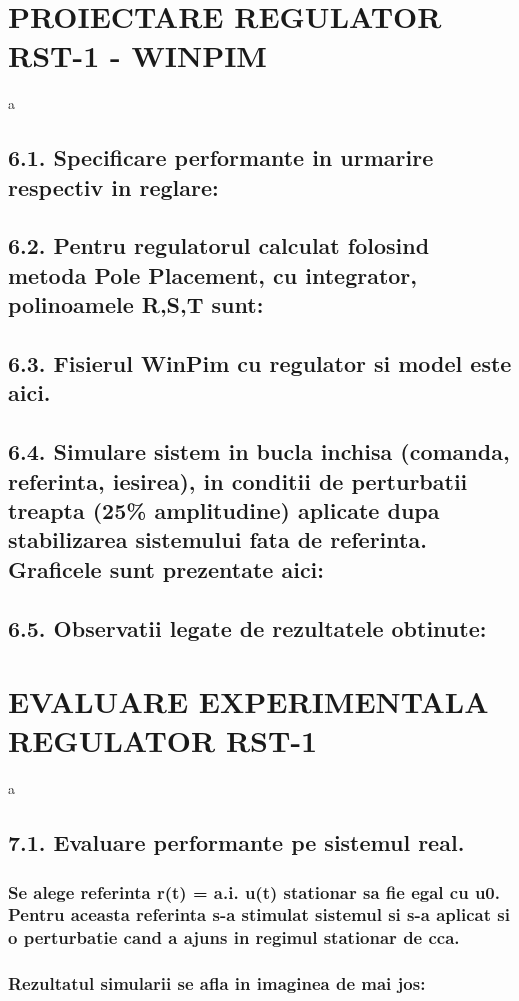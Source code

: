 \documentclass[12pt,english]{article}
\begin{document}
\section { PROIECTARE REGULATOR RST-1 - WINPIM }
a
\subsection {6.1. Specificare performante in urmarire respectiv in reglare: }
\subsection {6.2. Pentru regulatorul calculat folosind metoda Pole Placement, cu integrator, polinoamele R,S,T sunt: }
\subsection {6.3. Fisierul WinPim cu regulator si model este aici. }
\subsection {6.4. Simulare sistem in bucla inchisa (comanda, referinta, iesirea), in conditii de perturbatii treapta (25\% amplitudine) aplicate dupa stabilizarea sistemului fata de referinta. Graficele sunt prezentate aici: }
\subsection {6.5. Observatii legate de rezultatele obtinute: }

\section { EVALUARE EXPERIMENTALA REGULATOR RST-1 }
a
\subsection { 7.1. Evaluare performante pe sistemul real. }
\subsubsection { Se alege referinta r(t) = a.i. u(t) stationar sa fie egal cu u0. Pentru aceasta referinta s-a stimulat sistemul si s-a aplicat si o perturbatie cand a ajuns in regimul stationar de cca.}
\subsubsection { Rezultatul simularii se afla in imaginea de mai jos: }
\end{document}

